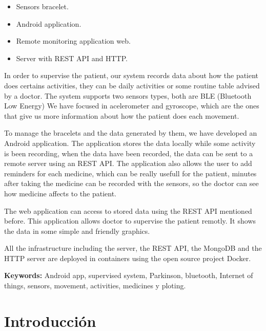 \begin{itemize}
	\item Sensors bracelet.
    \item Android application.
    \item Remote monitoring application web.
    \item Server with REST API and HTTP.
\end{itemize}

In order to supervise the patient, our system records data about how the patient does certains activities, they can be daily activities or some routine table advised by a doctor. The system supports two sensors types, both are BLE (Bluetooth Low Energy) We have focused in acelerometer and gyroscope, which are the ones that give us more information about how the patient does each movement.
\newline

To manage the bracelets and the data generated by them, we have developed an Android application. The application stores the data locally while some activity is been recording, when the data have been recorded, the data can be sent to a remote server using an REST API. The application also allows the user to add reminders for each medicine, which can be really usefull for the patient, minutes after taking the medicine can be recorded with the sensors, so the doctor can see how medicine affects to the patient.
\newline

The web application can access to stored data using the REST API mentioned before. This application allows doctor to supervise the patient remotly. It shows the data in some simple and friendly graphics.
\newline

All the infrastructure including the server, the REST API, the MongoDB and the HTTP server are deployed in containers using the open source project Docker.
\newline

{\bf Keywords:} Android app, supervised system, Parkinson, bluetooth, Internet of things, sensors, movement, activities, medicines y ploting.

\newpage
\blankpage


\newpage
\tableofcontents
\newpage
\listoffigures
\newpage
\section{Introducción}

